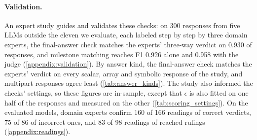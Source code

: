 \paragraph{Validation.} An expert study guides and validates these checks: on 300 responses from
five LLMs outside the eleven we evaluate, each labeled step by step by three domain experts, the
final-answer check matches the experts' three-way verdict on 0.930 of responses, and milestone
matching reaches F1 0.926 alone and 0.958 with the judge (\autoref{appendix:validation}).
By answer kind, the final-answer check matches the experts' verdict on every scalar, array and
symbolic response of the study, and multipart responses agree least (\autoref{tab:answer_kinds}).
The study also informed the checks' settings, so these figures are in-sample, except that
$\epsilon$ is also fitted on one half of the responses and measured on the other
(\autoref{tab:scoring_settings}).
On the evaluated models, domain experts confirm 160 of 166 readings of correct verdicts, 75 of 86
of incorrect ones, and 83 of 98 readings of reached rulings (\autoref{appendix:readings}).
